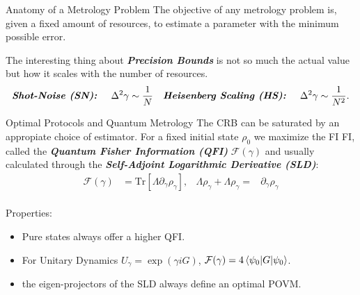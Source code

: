 \documentclass[final]{beamer}
\newlength{\colwidth}
\begin{document}
\begin{frame}[t]
\begin{columns}[t]
\begin{column}{\colwidth}
 \begin{block}{Anatomy of a Metrology Problem}
   The objective of any metrology problem is, given a fixed amount of resources, to estimate a parameter with the minimum possible error.
   \vspace{-0.07\linewidth}
   
   \vspace{-0.11\linewidth}
   The interesting thing about  \textbf{\textit{Precision Bounds}} is not so much the actual value but how it scales with the number of
   resources.
  \begin{align*}
    \text{\textbf{\textit{Shot-Noise (SN):}}}\hspace{0.5cm} \Delta^{2} \gamma &\sim \frac{1}{N} &
                                                                                                            \text{\textbf{\textit{Heisenberg Scaling (HS):}}} \hspace{0.5cm}\Delta^{2} \gamma \sim \frac{1}{N^{2}}.
  \end{align*}
 \end{block}
 \begin{block}{Optimal Protocols and Quantum Metrology}
  The CRB can be saturated by an appropiate choice of estimator. For a fixed initial state $\rho_{0}$ we maximize the FI
  FI, called the \textit{\textbf{Quantum Fisher Information (QFI)}} $\mathcal{F}(\gamma)$
   and usually calculated through the \textit{\textbf{Self-Adjoint Logarithmic Derivative (SLD)}}:
  \begin{align*}
     \mathcal{F}(\gamma) &= \mathrm{Tr}[\Lambda \partial_{\gamma}\rho_{\gamma}], & \Lambda \rho_{\gamma} + \Lambda \rho_{\gamma} =& \partial_{\gamma} \rho_{\gamma}
  \end{align*}
   \\
  Properties:
\begin{itemize}
        \item Pure states always offer a higher QFI.
        \item For Unitary Dynamics $U_{\gamma}=\exp({\gamma iG})$, $\mathcal{F}(\gamma)=4\braket{\psi_{0} | G | \psi_{0}}$.
        \item the eigen-projectors of the SLD always define an optimal POVM.
\end{itemize}
\end{block}



\end{column}
\end{columns}
\end{frame}
\end{document}
